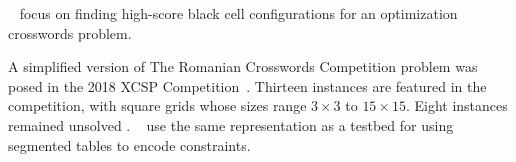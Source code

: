 \citeauthor{DBLP:conf/cig/BulitkoB21}~
focus on finding high-score black cell configurations for an optimization crosswords problem.

A simplified version of The Romanian Crosswords Competition problem was posed
in the 2018 XCSP Competition~\cite{DBLP:journals/corr/abs-1901-01830}.
Thirteen instances are featured in the competition, 
with square grids whose sizes range $3 \times 3$ to $15 \times 15$.
Eight instances remained unsolved \cite{DBLP:journals/corr/abs-1901-01830}.
\citeauthor{DBLP:conf/ecai/AudemardLM20}~
use the same representation
as a testbed for using segmented tables
to encode constraints.
%
